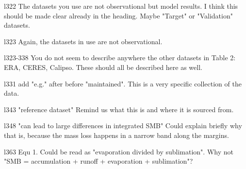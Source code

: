 \documentclass[12pt,oneside,a4paper]{article}%
\begin{document}
{\color{blue}{I'm not sure I see the contradiction the reviewer is referring to, but this a clearly a redundancy that we've eliminated by consolidating the paragraphs.}} \newline

l322 The datasets you use are not observational but model results. I think this should be made clear already in the heading. Maybe "Target" or "Validation" datasets. \newline

{\color{blue}{Done.}} \newline

l323 Again, the datasets in use are not observational. \newline

{\color{blue}{Done.}} \newline

l323-338 You do not seem to describe anywhere the other datasets in Table 2: ERA, CERES, Calipso. These should all be described here as well. \newline

{\color{blue}{Done.}} \newline

l331 add "e.g." after before "maintained". This is a very specific collection of the data. \newline

{\color{blue}{I'm not sure I follow, but I did clarify the second category to be less specific (remote sensing datasets instead of radar accumulation datasets).}} \newline

l343 "reference dataset" Remind us what this is and where it is sourced from. \newline

{\color{blue}{Clarified the reference dataset and added citation.}} \newline

l348 "can lead to large differences in integrated SMB" Could explain briefly why that is, because the mass loss happens in a narrow band along the margins. \newline

{\color{blue}{The Hansen paper indicates that differences in the ice masks occur in its representation of the ice margins, where lots of melting conceivable occurs. So an erroneously small ice mask may overestimate the SMB due to omitting areas where melting occurs. }} \newline

l363 Equ 1. Could be read as "evaporation divided by sublimation". Why not "SMB = accumulation + runoff + evaporation + sublimation"? \newline
\end{document}
